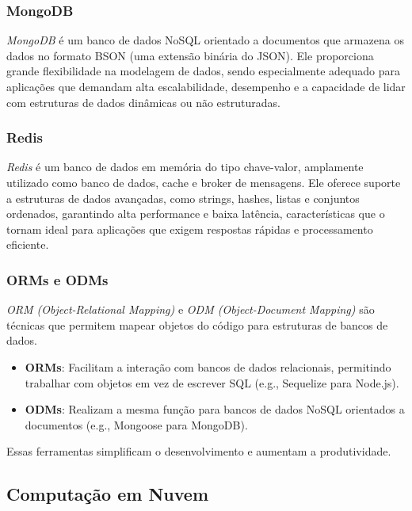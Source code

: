 \subsubsection{MongoDB}

\emph{MongoDB} é um banco de dados NoSQL orientado a documentos que armazena os dados no formato BSON (uma extensão binária do JSON). Ele proporciona grande flexibilidade na modelagem de dados, sendo especialmente adequado para aplicações que demandam alta escalabilidade, desempenho e a capacidade de lidar com estruturas de dados dinâmicas ou não estruturadas.

\subsubsection{Redis}

\emph{Redis} é um banco de dados em memória do tipo chave-valor, amplamente utilizado como banco de dados, cache e broker de mensagens. Ele oferece suporte a estruturas de dados avançadas, como strings, hashes, listas e conjuntos ordenados, garantindo alta performance e baixa latência, características que o tornam ideal para aplicações que exigem respostas rápidas e processamento eficiente.


\subsubsection{ORMs e ODMs}

\emph{ORM (Object-Relational Mapping)} e \emph{ODM (Object-Document Mapping)} são técnicas que permitem mapear objetos do código para estruturas de bancos de dados.

\begin{itemize}
    \item \textbf{ORMs}: Facilitam a interação com bancos de dados relacionais, permitindo trabalhar com objetos em vez de escrever SQL (e.g., Sequelize para Node.js).
    \item \textbf{ODMs}: Realizam a mesma função para bancos de dados NoSQL orientados a documentos (e.g., Mongoose para MongoDB).
\end{itemize}

Essas ferramentas simplificam o desenvolvimento e aumentam a produtividade.

\subsection{Computação em Nuvem}

